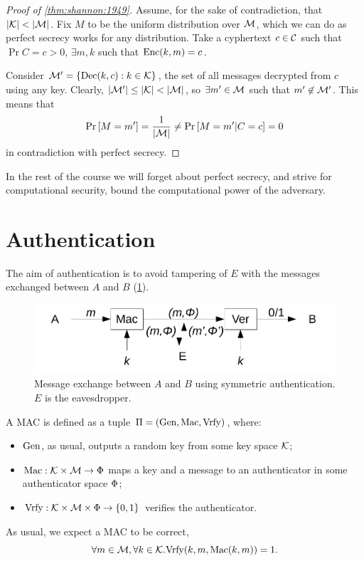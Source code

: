 \begin{proof}[Proof of \cref{thm:shannon:1949}]
	Assume, for the sake of contradiction, that $\left|{\mathcal{K}}\right| < \left|{\mathcal{M}}\right|$.
	Fix $M$ to be the uniform distribution over $\mathcal{M}$, which we can do as perfect secrecy works for any distribution.
	Take a cyphertext $c \in \mathcal{C}$ such that $\Pr{C = c} > 0$, \ie $\exists m, k$ such that $\mathrm{Enc}(k,m) = c$.

	Consider $\mathcal{M}' = \{ \mathrm{Dec}(k,c) : k \in \mathcal{K} \}$, the set of all messages decrypted from $c$ using any key.
	Clearly, $\left|{\mathcal{M}'}\right| \le \left|{\mathcal{K}}\right| < \left|{\mathcal{M}}\right|$, so $\exists m' \in \mathcal{M}$ such that $m' \not\in \mathcal{M}'$.
	This means that
	\begin{equation*}
		\mathop{\mathrm{Pr}}\limits_{} \left[ {M = m'} \right] = \frac{1}{\left|{\mathcal{M}}\right|} \neq \mathop{\mathrm{Pr}}\limits_{} \left[ {M = m' | C = c} \right] = 0
	\end{equation*}
	in contradiction with perfect secrecy.
\end{proof}

In the rest of the course we will forget about perfect secrecy, and strive for computational security, \ie bound the computational power of the adversary.

\section{Authentication}

The aim of authentication is to avoid tampering of $E$ with the messages exchanged between $A$ and $B$ (\cref{fig:symmetric-authentication}).

\begin{figure}
	\centering
	\includegraphics[width=0.8\linewidth]{drawings/symmetric-authentication.pdf}
	\caption{Message exchange between $A$ and $B$ using symmetric authentication. $E$ is the eavesdropper. \label{fig:symmetric-authentication}}
\end{figure}

A \ac{MAC} is defined as a tuple $\Pi = \left( \mathrm{Gen}, \allowbreak \mathrm{Mac}, \allowbreak \mathrm{Vrfy} \right)$, where:
\begin{itemize}
	\item $\mathrm{Gen}$, as usual, outputs a random key from some key space $\mathcal{K}$;
	\item $\mathrm{Mac} : \mathcal{K} \times \mathcal{M} \to \Phi$ maps a key and a message to an authenticator in some authenticator space $\Phi$;
	\item $\mathrm{Vrfy} : \mathcal{K} \times \mathcal{M} \times \Phi \to \{0,1\}$ verifies the authenticator.
\end{itemize}
As usual, we expect a \ac{MAC} to be correct, \ie
\begin{equation*}
	\forall m \in \mathcal{M}, \forall k \in \mathcal{K} . \mathrm{Vrfy}(k, m, \mathrm{Mac}(k, m)) = 1.
\end{equation*}

